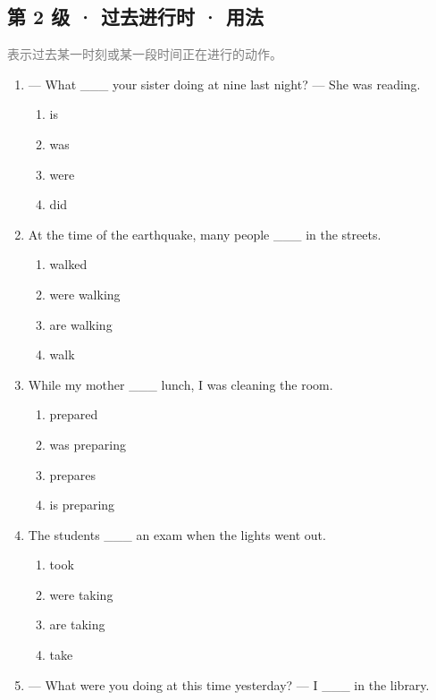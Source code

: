 \documentclass[11pt,a4paper]{ctexart}
\begin{document}
\subsection*{第 2 级 · 过去进行时 · 用法}
\noindent\textcolor{gray}{表示过去某一时刻或某一段时间正在进行的动作。}\par\smallskip
\begin{enumerate}[leftmargin=*,itemsep=4pt]
\item — What \_\_\_ your sister doing at nine last night? — She was reading.
\begin{enumerate}[label=\Alph*.,leftmargin=2em,itemsep=1pt,topsep=2pt]
\item is
\item was
\item were
\item did
\end{enumerate}
\item At the time of the earthquake, many people \_\_\_ in the streets.
\begin{enumerate}[label=\Alph*.,leftmargin=2em,itemsep=1pt,topsep=2pt]
\item walked
\item were walking
\item are walking
\item walk
\end{enumerate}
\item While my mother \_\_\_ lunch, I was cleaning the room.
\begin{enumerate}[label=\Alph*.,leftmargin=2em,itemsep=1pt,topsep=2pt]
\item prepared
\item was preparing
\item prepares
\item is preparing
\end{enumerate}
\item The students \_\_\_ an exam when the lights went out.
\begin{enumerate}[label=\Alph*.,leftmargin=2em,itemsep=1pt,topsep=2pt]
\item took
\item were taking
\item are taking
\item take
\end{enumerate}
\item — What were you doing at this time yesterday? — I \_\_\_ in the library.
\begin{enumerate}[label=\Alph*.,leftmargin=2em,itemsep=1pt,topsep=2pt]

\end{enumerate}
\end{enumerate}
\end{document}
